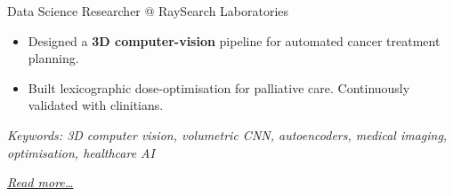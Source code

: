 \large{Data Science Researcher @ RaySearch Laboratories}

\normalsize
\begin{itemize}
    \item Designed a \textbf{3D computer-vision} pipeline for automated cancer treatment planning.
    \item Built lexicographic dose-optimisation for palliative care. Continuously validated with clinitians.
\end{itemize}

{\footnotesize\textit{Keywords: 3D computer vision, volumetric CNN, autoencoders, medical imaging, optimisation, healthcare AI}}

\hfill{\small{\textit{\hyperref[sec:raysearch]{Read more…}}}}

